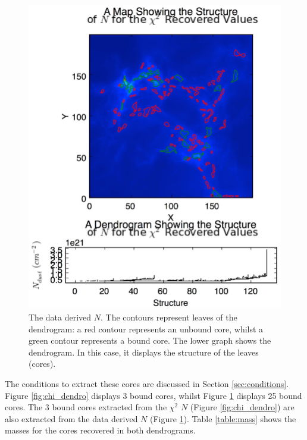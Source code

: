 \documentclass{report}
\begin{document}
\begin{figure}[H]
  \includegraphics[width=\linewidth]{../img/N_data_inp.jpg}
  \caption{The data derived $N$. The contours represent leaves of the dendrogram: a red contour represents an unbound core, whilst a green contour represents a bound core. The lower graph shows the dendrogram. In this case, it displays the structure of the leaves (cores).}\label{fig:data_dendro}
\endminipage
\end{figure}

The conditions to extract these cores are discussed in Section \ref{sec:conditions}. Figure \ref{fig:chi_dendro} displays 3 bound cores, whilst Figure \ref{fig:data_dendro} displays 25 bound cores. The 3 bound cores extracted from the $\chi^{2}$ $N$ (Figure \ref{fig:chi_dendro}) are also extracted from the data derived $N$
(Figure \ref{fig:data_dendro}). Table \ref{table:mass} shows the masses for the cores recovered in both dendrograms.
\end{document}
